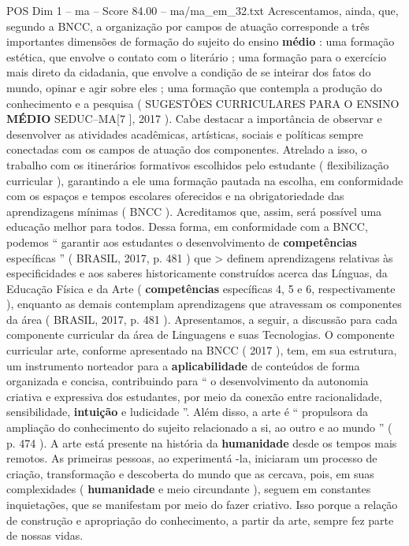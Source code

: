 \begin{textsample}{POS Dim 1 – ma – Score 84.00 – ma/ma\_em\_32.txt}
Acrescentamos, ainda, que, segundo a BNCC, a organização por campos de atuação corresponde a três importantes dimensões de formação do sujeito do ensino \textbf{médio} : uma formação estética, que envolve o contato com o literário ; uma formação para o exercício mais direto da cidadania, que envolve a condição de se inteirar dos fatos do mundo, opinar e agir sobre eles ; uma formação que contempla a produção do conhecimento e a pesquisa ( SUGESTÕES CURRICULARES PARA O ENSINO \textbf{MÉDIO} SEDUC–MA[7 ], 2017 ).
Cabe destacar a importância de observar e desenvolver as atividades acadêmicas, artísticas, sociais e políticas sempre conectadas com os campos de atuação dos componentes.
Atrelado a isso, o trabalho com os itinerários formativos escolhidos pelo estudante ( flexibilização curricular ), garantindo a ele uma formação pautada na escolha, em conformidade com os espaços e tempos escolares oferecidos e na obrigatoriedade das aprendizagens mínimas ( BNCC ).
Acreditamos que, assim, será possível uma educação melhor para todos.
Dessa forma, em conformidade com a BNCC, podemos “ garantir aos estudantes o desenvolvimento de \textbf{competências} específicas ” ( BRASIL, 2017, p. 481 ) que > definem aprendizagens relativas às especificidades e aos saberes historicamente construídos acerca das Línguas, da Educação Física e da Arte ( \textbf{competências} específicas 4, 5 e 6, respectivamente ), enquanto as demais contemplam aprendizagens que atravessam os componentes da área ( BRASIL, 2017, p. 481 ).
Apresentamos, a seguir, a discussão para cada componente curricular da área de Linguagens e suas Tecnologias.
O componente curricular arte, conforme apresentado na BNCC ( 2017 ), tem, em sua estrutura, um instrumento norteador para a \textbf{aplicabilidade} de conteúdos de forma organizada e concisa, contribuindo para “ o desenvolvimento da autonomia criativa e expressiva dos estudantes, por meio da conexão entre racionalidade, sensibilidade, \textbf{intuição} e ludicidade ”.
Além disso, a arte é “ propulsora da ampliação do conhecimento do sujeito relacionado a si, ao outro e ao mundo ” ( p. 474 ).
A arte está presente na história da \textbf{humanidade} desde os tempos mais remotos.
As primeiras pessoas, ao experimentá -la, iniciaram um processo de criação, transformação e descoberta do mundo que as cercava, pois, em suas complexidades ( \textbf{humanidade} e meio circundante ), seguem em constantes inquietações, que se manifestam por meio do fazer criativo.
Isso porque a relação de construção e apropriação do conhecimento, a partir da arte, sempre fez parte de nossas vidas.

\end{textsample}
